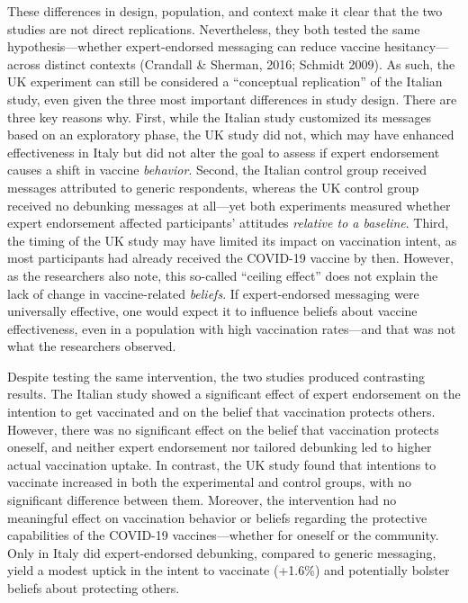 \documentclass[authordate, reflection,issue]{jote-new-article}
\begin{document}
	These differences in design, population, and context make it clear that the two studies are not direct replications. Nevertheless, they both tested the same hypothesis—whether expert-endorsed messaging can reduce vaccine hesitancy—across distinct contexts (Crandall \& Sherman, 2016; Schmidt 2009). As such, the UK experiment can still be considered a “conceptual replication” of the Italian study, even given the three most important differences in study design. There are three key reasons why. First, while the Italian study customized its messages based on an exploratory phase, the UK study did not, which may have enhanced effectiveness in Italy but did not alter the goal to assess if expert endorsement causes a shift in vaccine \emph{behavior}. Second, the Italian control group received messages attributed to generic respondents, whereas the UK control group received no debunking messages at all—yet both experiments measured whether expert endorsement affected participants' attitudes \emph{relative to a baseline}. Third, the timing of the UK study may have limited its impact on vaccination intent, as most participants had already received the COVID-19 vaccine by then. However, as the researchers also note, this so-called “ceiling effect” does not explain the lack of change in vaccine-related \emph{beliefs}. If expert-endorsed messaging were universally effective, one would expect it to influence beliefs about vaccine effectiveness, even in a population with high vaccination rates—and that was not what the researchers observed.







	Despite testing the same intervention, the two studies produced contrasting results. The Italian study showed a significant effect of expert endorsement on the intention to get vaccinated and on the belief that vaccination protects others. However, there was no significant effect on the belief that vaccination protects oneself, and neither expert endorsement nor tailored debunking led to higher actual vaccination uptake. In contrast, the UK study found that intentions to vaccinate increased in both the experimental and control groups, with no significant difference between them. Moreover, the intervention had no meaningful effect on vaccination behavior or beliefs regarding the protective capabilities of the COVID-19 vaccines—whether for oneself or the community. Only in Italy did expert-endorsed debunking, compared to generic messaging, yield a modest uptick in the intent to vaccinate (+1.6\%) and potentially bolster beliefs about protecting others.
\end{document}
